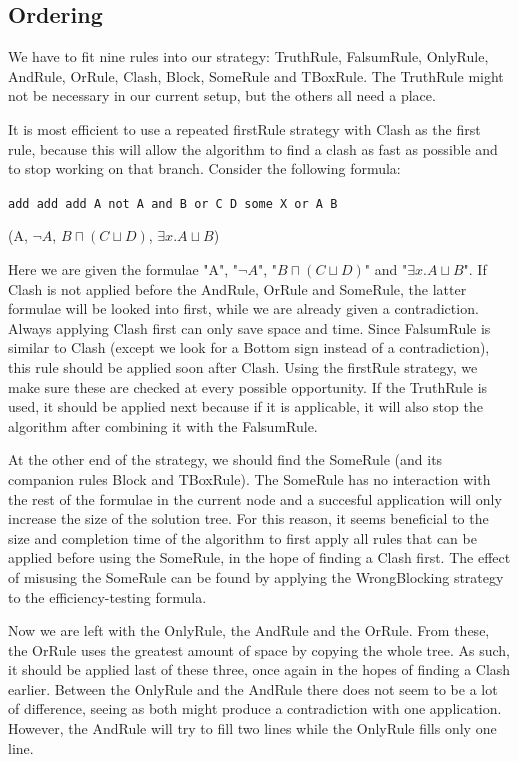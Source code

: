 \documentclass[11pt]{article} %
\begin{document}
\subsection{Ordering}
\label{sec:Ordering}

We have to fit nine rules into our strategy: TruthRule, FalsumRule, OnlyRule, AndRule, OrRule, Clash, Block, SomeRule and TBoxRule. The TruthRule might not be necessary in our current setup, but the others all need a place. 

It is most efficient to use a repeated firstRule strategy with Clash as the first rule, because this will allow the algorithm to find a clash as fast as possible and to stop working on that branch. Consider the following formula: 

\begin{center}
\texttt{add add add A not A and B or C D some X or A B}

(A, $\neg A$, $B\sqcap (C \sqcup D)$, $\exists x. A \sqcup B$)
\end{center} 

Here we are given the formulae "A", "$\neg A$", "$B\sqcap (C \sqcup D)$" and "$\exists x. A \sqcup B$". If Clash is not applied before the AndRule, OrRule and SomeRule, the latter formulae will be looked into first, while we are already given a contradiction. Always applying Clash first can only save space and time. Since FalsumRule is similar to Clash (except we look for a Bottom sign instead of a contradiction), this rule should be applied soon after Clash. Using the firstRule strategy, we make sure these are checked at every possible opportunity.
If the TruthRule is used, it should be applied next because if it is applicable, it will also stop the algorithm after combining it with the FalsumRule.

At the other end of the strategy, we should find the SomeRule (and its companion rules Block and TBoxRule). The SomeRule has no interaction with the rest of the formulae in the current node and a succesful application will only increase the size of the solution tree. For this reason, it seems beneficial to the size and completion time of the algorithm to first apply all rules that can be applied before using the SomeRule, in the hope of finding a Clash first. The effect of misusing the SomeRule can be found by applying the WrongBlocking strategy to the efficiency-testing formula.

Now we are left with the OnlyRule, the AndRule and the OrRule. From these, the OrRule uses the greatest amount of space by copying the whole tree. As such, it should be applied last of these three, once again in the hopes of finding a Clash earlier. Between the OnlyRule and the AndRule there does not seem to be a lot of difference, seeing as both might produce a contradiction with one application. However, the AndRule will try to fill two lines while the OnlyRule fills only one line.
\end{document}
